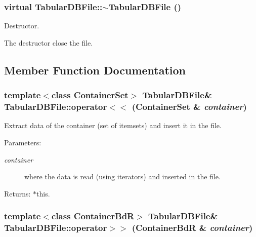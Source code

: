 \subsubsection{\setlength{\rightskip}{0pt plus 5cm}virtual Tabular\-DBFile::$\sim$Tabular\-DBFile ()\hspace{0.3cm}{\tt  [inline, virtual]}}\label{class_tabular_d_b_file_9d038f6432720287f5a5aca26ab8df2e}


Destructor. 

The destructor close the file. 

\subsection{Member Function Documentation}
\subsubsection{\setlength{\rightskip}{0pt plus 5cm}template$<$class Container\-Set$>$ {\bf Tabular\-DBFile}\& Tabular\-DBFile::operator$<$$<$ (Container\-Set \& {\em container})\hspace{0.3cm}{\tt  [inline]}}\label{class_tabular_d_b_file_e482df0bdff0ce8b734a3a3a2a255aed}


Extract data of the container (set of itemsets) and insert it in the file. 

\begin{Desc}
\item[Parameters:]
\begin{description}
\item[{\em container}]where the data is read (using iterators) and inserted in the file. \end{description}
\end{Desc}
\begin{Desc}
\item[Returns:]$\ast$this. \end{Desc}
\subsubsection{\setlength{\rightskip}{0pt plus 5cm}template$<$class Container\-Bd\-R$>$ {\bf Tabular\-DBFile}\& Tabular\-DBFile::operator$>$$>$ (Container\-Bd\-R \& {\em container})\hspace{0.3cm}{\tt  [inline]}}\label{class_tabular_d_b_file_6b9390b5d1e89edc3f33f1968a711308}


